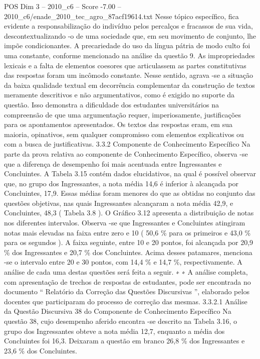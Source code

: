 \begin{textsample}{POS Dim 3 – 2010\_c6 – Score -7.00 – 2010\_c6/enade\_2010\_tec\_agro\_87acf19614.txt}
Nesse tópico específico, fica evidente a responsabilização do indivíduo pelos percalços e fracassos de sua vida, descontextualizando -o de uma sociedade que, em seu movimento de conjunto, lhe impõe condicionantes.
A precariedade do uso da língua pátria de modo culto foi uma constante, conforme mencionado na análise da questão 9.
As impropriedades lexicais e a falta de elementos coesores que articulassem as partes constitutivas das respostas foram um incômodo constante.
Nesse sentido, agrava -se a situação da baixa qualidade textual em decorrência complementar da construção de textos meramente descritivos e não argumentativos, como é exigido no suporte da questão.
Isso demonstra a dificuldade dos estudantes universitários na compreensão de que uma argumentação requer, imperiosamente, justificações para os apontamentos apresentados.
Os textos das respostas eram, em sua maioria, opinativos, sem qualquer compromisso com elementos explicativos ou com a busca de justificativas. 3.3.2 Componente de Conhecimento Específico Na parte da prova relativa ao componente de Conhecimento Específico, observa -se que a diferença de desempenho foi mais acentuada entre Ingressantes e Concluintes.
A Tabela 3.15 contém dados elucidativos, na qual é possível observar que, no grupo dos Ingressantes, a nota média 14,6 é inferior à alcançada por Concluintes, 17,9.
Essas médias foram menores do que as obtidas no conjunto das questões objetivas, nas quais Ingressantes alcançaram a nota média 42,9, e Concluintes, 48,3 ( Tabela 3.8 ).
O Gráfico 3.12 apresenta a distribuição de notas nos diferentes intervalos.
Observa -se que Ingressantes e Concluintes atingiram notas mais elevadas na faixa entre zero e 10 ( 50,6 \% para os primeiros e 43,0 \% para os segundos ).
A faixa seguinte, entre 10 e 20 pontos, foi alcançada por 20,9 \% dos Ingressantes e 20,7 \% dos Concluintes.
Acima desses patamares, menciona -se o intervalo entre 20 e 30 pontos, com 14,4 \% e 14,7 \%, respectivamente.
A análise de cada uma destas questões será feita a seguir. ∗ ∗ A análise completa, com apresentação de trechos de respostas de estudantes, pode ser encontrada no documento “ Relatório da Correção das Questões Discursivas ”, elaborado pelos docentes que participaram do processo de correção das mesmas. 3.3.2.1 Análise da Questão Discursiva 38 do Componente de Conhecimento Específico Na questão 38, cujo desempenho aferido encontra -se descrito na Tabela 3.16, o grupo dos Ingressantes obteve a nota média 12,7, enquanto a média dos Concluintes foi 16,3.
Deixaram a questão em branco 26,8 \% dos Ingressantes e 23,6 \% dos Concluintes.

\end{textsample}

